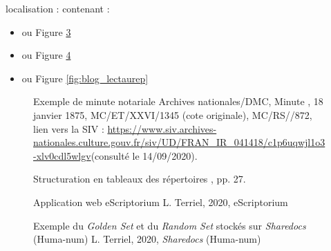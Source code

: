 localisation :  contenant :
\begin{itemize}
    \item {} ou Figure \ref{fig:appli_eScriptorium}
    \item {} ou Figure \ref{fig:shareDocs}
    \item {} ou Figure \ref{fig:blog_lectaurep}
\end{itemize}

\begin{figure}[h!]
    \centering
    \centerline{}
    \caption{Exemple de minute notariale \textcopyright Archives nationales/DMC, Minute , 18 janvier 1875,  MC/ET/XXVI/1345 (cote originale), MC/RS//872, lien vers la SIV : \url{https://www.siv.archives-nationales.culture.gouv.fr/siv/UD/FRAN_IR_041418/c1p6uqwjl1o3-xlv0cdl5wlgv}(consulté le 14/09/2020).}
    \label{fig:exemple_minute}
\end{figure}

\begin{figure}[h!]
    \centering
    \centerline{}
    \caption{Structuration en tableaux des répertoires \textcopyright \cite{bonhomme_defis_2018}, pp. 27.} 
    \label{fig:tableaux_repertoires}
\end{figure}

\begin{figure}[h]
    \centering
    \centerline{}
    \caption{Application web eScriptorium \textcopyright L. Terriel, 2020, eScriptorium} 
    \label{fig:appli_eScriptorium}
\end{figure}

\begin{figure}[h]
    \centering
    \centerline{}
    \caption{Exemple du \textit{Golden Set} et du \textit{Random Set} stockés sur \textit{Sharedocs} (Huma-num) \textcopyright L. Terriel, 2020, \textit{Sharedocs} (Huma-num)} 
    \label{fig:shareDocs}
\end{figure}

